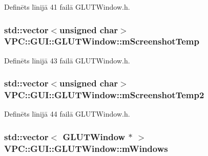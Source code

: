 Definēts līnijā 41 failā G\+L\+U\+T\+Window.\+h.

\subsubsection[{\texorpdfstring{m\+Screenshot\+Temp}{mScreenshotTemp}}]{\setlength{\rightskip}{0pt plus 5cm}std\+::vector$<$unsigned char$>$ V\+P\+C\+::\+G\+U\+I\+::\+G\+L\+U\+T\+Window\+::m\+Screenshot\+Temp\hspace{0.3cm}{\ttfamily [protected]}}\hypertarget{class_v_p_c_1_1_g_u_i_1_1_g_l_u_t_window_a3fb2ef7f66b526626c242cf35a4af080}{}\label{class_v_p_c_1_1_g_u_i_1_1_g_l_u_t_window_a3fb2ef7f66b526626c242cf35a4af080}


Definēts līnijā 43 failā G\+L\+U\+T\+Window.\+h.

\subsubsection[{\texorpdfstring{m\+Screenshot\+Temp2}{mScreenshotTemp2}}]{\setlength{\rightskip}{0pt plus 5cm}std\+::vector$<$unsigned char$>$ V\+P\+C\+::\+G\+U\+I\+::\+G\+L\+U\+T\+Window\+::m\+Screenshot\+Temp2\hspace{0.3cm}{\ttfamily [protected]}}\hypertarget{class_v_p_c_1_1_g_u_i_1_1_g_l_u_t_window_a9a373bab4c85c9a39d5b188311509ea6}{}\label{class_v_p_c_1_1_g_u_i_1_1_g_l_u_t_window_a9a373bab4c85c9a39d5b188311509ea6}


Definēts līnijā 44 failā G\+L\+U\+T\+Window.\+h.

\subsubsection[{\texorpdfstring{m\+Windows}{mWindows}}]{\setlength{\rightskip}{0pt plus 5cm}std\+::vector$<$ {\bf G\+L\+U\+T\+Window} $\ast$ $>$ V\+P\+C\+::\+G\+U\+I\+::\+G\+L\+U\+T\+Window\+::m\+Windows\hspace{0.3cm}{\ttfamily [static]}}\hypertarget{class_v_p_c_1_1_g_u_i_1_1_g_l_u_t_window_aad2948c3a88afb3bc03f9bc54a81f285}{}\label{class_v_p_c_1_1_g_u_i_1_1_g_l_u_t_window_aad2948c3a88afb3bc03f9bc54a81f285}


